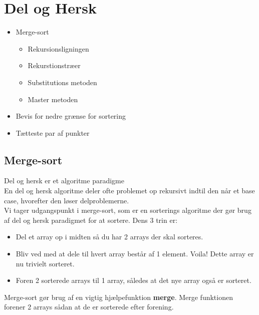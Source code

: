 \section{Del og Hersk}
\hrulefill
\begin{itemize}
\item Merge-sort
  \begin{itemize}
  \item Rekursionsligningen
  \item Rekurstionstræer
  \item Substitutions metoden
  \item Master metoden
  \end{itemize}
\item Bevis for nedre grænse for sortering
\item Tætteste par af punkter
\end{itemize}

\newpage
\subsection{Merge-sort}
Del og hersk er et algoritme paradigme\\

En del og hersk algoritme deler ofte problemet op rekursivt indtil den når et base case, hvorefter den løser delproblemerne.\\

Vi tager udgangspunkt i merge-sort, som er en sorterings algoritme der gør brug af del og hersk paradigmet for at sortere. Dens 3 trin er:
\begin{itemize}
\item Del et array op i midten så du har 2 arrays der skal sorteres.
\item Bliv ved med at dele til hvert array består af 1 element. Voila! Dette array er nu trivielt sorteret.
\item Foren 2 sorterede arrays til 1 array, således at det nye array også er sorteret.
\end{itemize}

Merge-sort gør brug af en vigtig hjælpefunktion \textbf{merge}. Merge funktionen forener 2 arrays sådan at de er sorterede efter forening.

